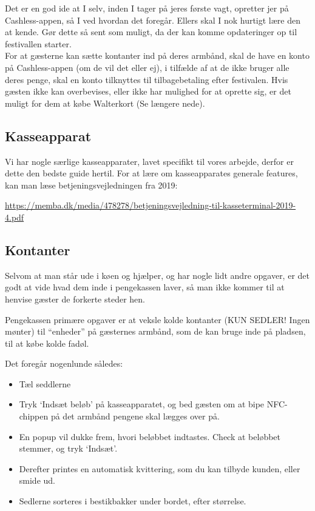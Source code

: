 Det er en god ide at I selv, inden I tager på jeres første vagt, opretter jer på
Cashless-appen, så I ved hvordan det foregår. Ellers skal I nok hurtigt lære den at kende.
Gør dette så sent som muligt, da der kan komme opdateringer op til festivallen starter. \\

For at gæsterne kan sætte kontanter ind på deres armbånd, skal de have en konto på 
Cashless-appen (om de vil det eller ej), 
i tilfælde af at de ikke bruger alle deres penge, skal en konto tilknyttes til tilbagebetaling efter
festivalen.
Hvis gæsten ikke kan overbevises, eller ikke har mulighed for at oprette sig, er det muligt 
for dem at købe Walterkort (Se længere nede).

\subsection{Kasseapparat}
Vi har nogle særlige kasseapparater, lavet specifikt til vores arbejde, derfor er dette den bedste guide hertil. 
For at lære om kasseapparates generale features, kan man læse betjeningsvejledningen fra 2019:
\begin{center}
  \small
  \href{https://memba.dk/media/478278/betjeningsvejledning-til-kasseterminal-2019-4.pdf}{https://memba.dk/media/478278/betjeningsvejledning-til-kasseterminal-2019-4.pdf}
\end{center}


\subsection{Kontanter}

Selvom at man står ude i køen og hjælper, og har nogle lidt andre opgaver, 
er det godt at vide hvad dem inde i pengekassen laver, 
så man ikke kommer til at henvise gæster de forkerte steder hen.

Pengekassen primære opgaver er at veksle kolde kontanter (KUN SEDLER! Ingen mønter) til ``enheder'' på gæsternes armbånd, 
som de kan bruge inde på pladsen, til at købe kolde fadøl.

Det foregår nogenlunde således:
\begin{itemize}
  \item Tæl seddlerne
  \item Tryk `Indsæt beløb' på kasseapparatet, og bed gæsten om at bipe NFC-chippen på det armbånd pengene 
  skal lægges over på.
  \item En popup vil dukke frem, hvori beløbbet indtastes. 
  Check at beløbbet stemmer, og tryk `Indsæt'.
  \item Derefter printes en automatisk kvittering, som du kan tilbyde kunden, eller smide ud.
  \item Sedlerne sorteres i bestikbakker under bordet, efter størrelse.
\end{itemize}

